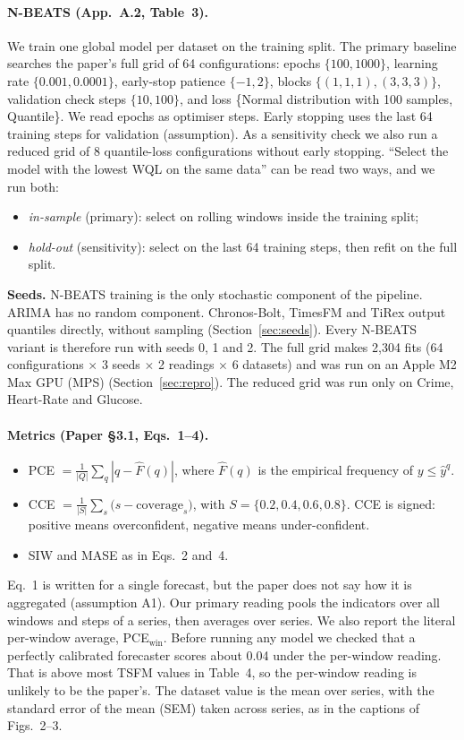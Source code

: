 \paragraph{N-BEATS (App.~A.2, Table~3).} We train one global model per dataset on the training split. The
primary baseline searches the paper's full grid of 64 configurations: epochs $\{100,1000\}$, learning rate
$\{0.001,0.0001\}$, early-stop patience $\{-1,2\}$, blocks $\{(1,1,1),(3,3,3)\}$, validation check steps
$\{10,100\}$, and loss \{Normal distribution with 100 samples, Quantile\}. We read epochs as optimiser steps.
Early stopping uses the last 64 training steps for validation (assumption). As a sensitivity check we also run
a reduced grid of 8 quantile-loss configurations without early stopping. ``Select the model with the lowest
WQL on the same data'' can be read two ways, and we run both:
\begin{itemize}
\item \emph{in-sample} (primary): select on rolling windows inside the training split;
\item \emph{hold-out} (sensitivity): select on the last 64 training steps, then refit on the full split.
\end{itemize}
\noindent\textbf{Seeds.} N-BEATS training is the only stochastic component of the pipeline. ARIMA has no random
component. Chronos-Bolt, TimesFM and TiRex output quantiles directly, without sampling
(Section~\ref{sec:seeds}). Every N-BEATS variant is therefore run with seeds 0, 1 and 2. The full grid makes
2{,}304 fits (64 configurations $\times$ 3 seeds $\times$ 2 readings $\times$ 6 datasets) and was run on an
Apple M2 Max GPU (MPS) (Section~\ref{sec:repro}). The reduced grid was run only on Crime, Heart-Rate and Glucose.

\paragraph{Metrics (Paper \S3.1, Eqs.~1--4).}
\begin{itemize}
\item PCE $=\frac{1}{|Q|}\sum_q |q-\hat F(q)|$, where $\hat F(q)$ is the empirical frequency of $y\le\hat y^{q}$.
\item CCE $=\frac{1}{|S|}\sum_s \bigl(s-\mathrm{coverage}_s\bigr)$, with $S{=}\{0.2,0.4,0.6,0.8\}$. CCE is signed:
positive means overconfident, negative means under-confident.
\item SIW and MASE as in Eqs.~2 and~4.
\end{itemize}
Eq.~1 is written for a single forecast, but the paper does not say how it is aggregated (assumption A1).
Our primary reading pools the indicators over all windows and steps of a series, then averages over series.
We also report the literal per-window average, PCE$_{\mathrm{win}}$. Before running any model we checked that a
perfectly calibrated forecaster scores about 0.04 under the per-window reading. That is above most TSFM values in
Table~4, so the per-window reading is unlikely to be the paper's. The dataset value is the mean over series, with
the standard error of the mean (SEM) taken across series, as in the captions of Figs.~2--3.

